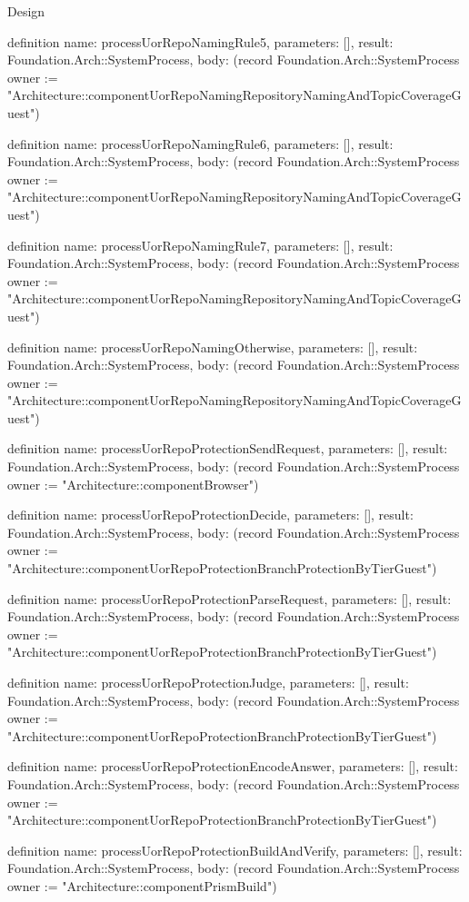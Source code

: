 \begin{lexlean}{Design}
\begin{semanticmodule}
definition{
  name: processUorRepoNamingRule5,
  parameters: [],
  result: Foundation.Arch::SystemProcess,
  body: (record Foundation.Arch::SystemProcess {owner := "Architecture::componentUorRepoNamingRepositoryNamingAndTopicCoverageGuest"})
}

definition{
  name: processUorRepoNamingRule6,
  parameters: [],
  result: Foundation.Arch::SystemProcess,
  body: (record Foundation.Arch::SystemProcess {owner := "Architecture::componentUorRepoNamingRepositoryNamingAndTopicCoverageGuest"})
}

definition{
  name: processUorRepoNamingRule7,
  parameters: [],
  result: Foundation.Arch::SystemProcess,
  body: (record Foundation.Arch::SystemProcess {owner := "Architecture::componentUorRepoNamingRepositoryNamingAndTopicCoverageGuest"})
}

definition{
  name: processUorRepoNamingOtherwise,
  parameters: [],
  result: Foundation.Arch::SystemProcess,
  body: (record Foundation.Arch::SystemProcess {owner := "Architecture::componentUorRepoNamingRepositoryNamingAndTopicCoverageGuest"})
}

definition{
  name: processUorRepoProtectionSendRequest,
  parameters: [],
  result: Foundation.Arch::SystemProcess,
  body: (record Foundation.Arch::SystemProcess {owner := "Architecture::componentBrowser"})
}

definition{
  name: processUorRepoProtectionDecide,
  parameters: [],
  result: Foundation.Arch::SystemProcess,
  body: (record Foundation.Arch::SystemProcess {owner := "Architecture::componentUorRepoProtectionBranchProtectionByTierGuest"})
}

definition{
  name: processUorRepoProtectionParseRequest,
  parameters: [],
  result: Foundation.Arch::SystemProcess,
  body: (record Foundation.Arch::SystemProcess {owner := "Architecture::componentUorRepoProtectionBranchProtectionByTierGuest"})
}

definition{
  name: processUorRepoProtectionJudge,
  parameters: [],
  result: Foundation.Arch::SystemProcess,
  body: (record Foundation.Arch::SystemProcess {owner := "Architecture::componentUorRepoProtectionBranchProtectionByTierGuest"})
}

definition{
  name: processUorRepoProtectionEncodeAnswer,
  parameters: [],
  result: Foundation.Arch::SystemProcess,
  body: (record Foundation.Arch::SystemProcess {owner := "Architecture::componentUorRepoProtectionBranchProtectionByTierGuest"})
}

definition{
  name: processUorRepoProtectionBuildAndVerify,
  parameters: [],
  result: Foundation.Arch::SystemProcess,
  body: (record Foundation.Arch::SystemProcess {owner := "Architecture::componentPrismBuild"})
}


\end{semanticmodule}
\end{lexlean}
